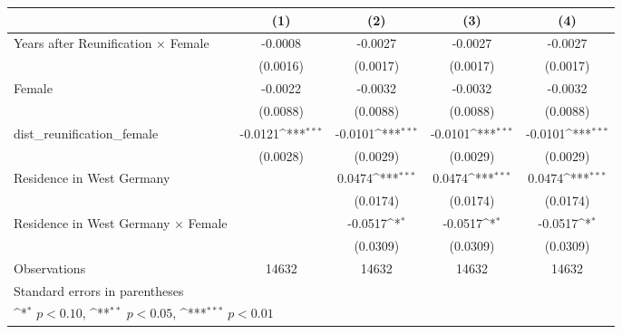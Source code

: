 {
\def\sym#1{\ifmmode^{#1}\else\(^{#1}\)\fi}
\begin{tabular}{l*{4}{c}}
\toprule
                    &\multicolumn{1}{c}{(1)}         &\multicolumn{1}{c}{(2)}         &\multicolumn{1}{c}{(3)}         &\multicolumn{1}{c}{(4)}         \\
\midrule
Years after Reunification $\times$ Female&     -0.0008         &     -0.0027         &     -0.0027         &     -0.0027         \\
                    &    (0.0016)         &    (0.0017)         &    (0.0017)         &    (0.0017)         \\
\addlinespace
Female              &     -0.0022         &     -0.0032         &     -0.0032         &     -0.0032         \\
                    &    (0.0088)         &    (0.0088)         &    (0.0088)         &    (0.0088)         \\
\addlinespace
dist\_reunification\_female&     -0.0121\sym{***}&     -0.0101\sym{***}&     -0.0101\sym{***}&     -0.0101\sym{***}\\
                    &    (0.0028)         &    (0.0029)         &    (0.0029)         &    (0.0029)         \\
\addlinespace
Residence in West Germany&                     &      0.0474\sym{***}&      0.0474\sym{***}&      0.0474\sym{***}\\
                    &                     &    (0.0174)         &    (0.0174)         &    (0.0174)         \\
\addlinespace
Residence in West Germany $\times$ Female&                     &     -0.0517\sym{*}  &     -0.0517\sym{*}  &     -0.0517\sym{*}  \\
                    &                     &    (0.0309)         &    (0.0309)         &    (0.0309)         \\
\midrule
Observations        &       14632         &       14632         &       14632         &       14632         \\
\bottomrule
\multicolumn{5}{l}{\footnotesize Standard errors in parentheses}\\
\multicolumn{5}{l}{\footnotesize \sym{*} \(p<0.10\), \sym{**} \(p<0.05\), \sym{***} \(p<0.01\)}\\
\end{tabular}
}
